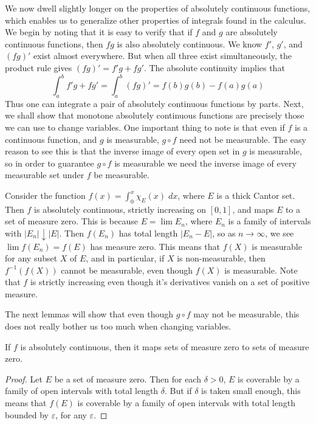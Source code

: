 We now dwell slightly longer on the properties of absolutely continuous functions, which enables us to generalize other properties of integrals found in the calculus. We begin by noting that it is easy to verify that if $f$ and $g$ are absolutely continuous functions, then $fg$ is also absolutely continuous. We know $f'$, $g'$, and $(fg)'$ exist almost everywhere. But when all three exist simultaneously, the product rule gives $(fg)' = f'g + fg'$. The absolute continuity implies that
%
\[ \int_a^b f'g + fg' = \int_a^b (fg)' = f(b)g(b) - f(a)g(a) \]
%
Thus one can integrate a pair of absolutely continuous functions by parts. Next, we shall show that monotone absolutely continuous functions are precisely those we can use to change variables. One important thing to note is that even if $f$ is a continuous function, and $g$ is measurable, $g \circ f$ need not be measurable. The easy reason to see this is that the inverse image of every open set in $g$ is measurable, so in order to guarantee $g \circ f$ is measurable we need the inverse image of every measurable set under $f$ be measurable.

\begin{example}
  Consider the function $f(x) = \int_0^x \chi_E(x)\; dx$, where $E$ is a thick Cantor set. Then $f$ is absolutely continuous, strictly increasing on $[0,1]$, and maps $E$ to a set of measure zero. This is because $E = \lim E_n$, where $E_n$ is a family of intervals with $|E_n| \downarrow |E|$. Then $f(E_n)$ has total length $|E_n - E|$, so as $n \to \infty$, we see $\lim f(E_n) = f(E)$ has measure zero.  This means that $f(X)$ is measurable for any subset $X$ of $E$, and in particular, if $X$ is non-measurable, then $f^{-1}(f(X))$ cannot be measurable, even though $f(X)$ is measurable. Note that $f$ is strictly increasing even though it's derivatives vanish on a set of positive measure.
\end{example}

The next lemmas will show that even though $g \circ f$ may not be measurable, this does not really bother us too much when changing variables.

\begin{lemma}
  If $f$ is absolutely continuous, then it maps sets of measure zero to sets of measure zero.
\end{lemma}
\begin{proof}
  Let $E$ be a set of measure zero. Then for each $\delta > 0$, $E$ is coverable by a family of open intervals with total length $\delta$. But if $\delta$ is taken small enough, this means that $f(E)$ is coverable by a family of open intervals with total length bounded by $\varepsilon$, for any $\varepsilon$.
\end{proof}

